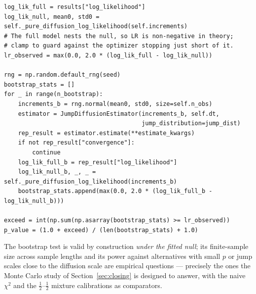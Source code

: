 \begin{lstlisting}[caption={The jump test in \code{estimation/maximum\_likelihood.py} (excerpt).}]
log_lik_full = results["log_likelihood"]
log_lik_null, mean0, std0 = self._pure_diffusion_log_likelihood(self.increments)
# The full model nests the null, so LR is non-negative in theory;
# clamp to guard against the optimizer stopping just short of it.
lr_observed = max(0.0, 2.0 * (log_lik_full - log_lik_null))

rng = np.random.default_rng(seed)
bootstrap_stats = []
for _ in range(n_bootstrap):
    increments_b = rng.normal(mean0, std0, size=self.n_obs)
    estimator = JumpDiffusionEstimator(increments_b, self.dt,
                                       jump_distribution=jump_dist)
    rep_result = estimator.estimate(**estimate_kwargs)
    if not rep_result["convergence"]:
        continue
    log_lik_full_b = rep_result["log_likelihood"]
    log_lik_null_b, _, _ = self._pure_diffusion_log_likelihood(increments_b)
    bootstrap_stats.append(max(0.0, 2.0 * (log_lik_full_b - log_lik_null_b)))

exceed = int(np.sum(np.asarray(bootstrap_stats) >= lr_observed))
p_value = (1.0 + exceed) / (len(bootstrap_stats) + 1.0)
\end{lstlisting}

\begin{remark}
The bootstrap test is valid by construction \emph{under the fitted null};
its finite-sample size across sample lengths and its power against
alternatives with small $p$ or jump scales close to the diffusion scale
are empirical questions --- precisely the ones the Monte Carlo study of
Section~\ref{sec:closing} is designed to answer, with the naive
$\chi^2$ and the $\tfrac12$--$\tfrac12$ mixture calibrations as
comparators.
\end{remark}
